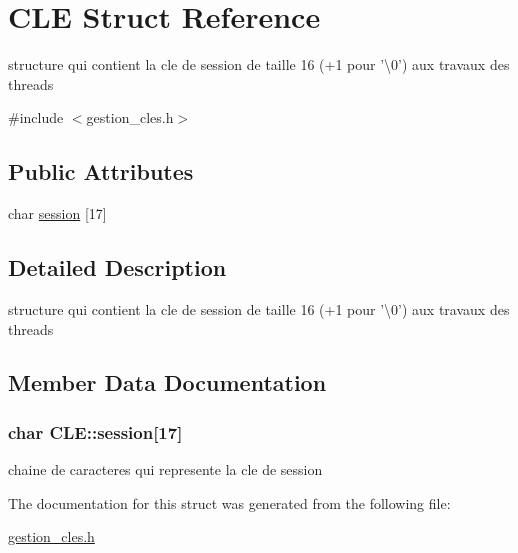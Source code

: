 \hypertarget{structCLE}{\section{C\-L\-E Struct Reference}
\label{structCLE}
}


structure qui contient la cle de session de taille 16 (+1 pour '\textbackslash{}0') aux travaux des threads  




{\ttfamily \#include $<$gestion\-\_\-cles.\-h$>$}

\subsection*{Public Attributes}
\begin{DoxyCompactItemize}
\item 
char \hyperlink{structCLE_ab52c7ba5d2eb2f86eea0e6a9da21d55c}{session} \mbox{[}17\mbox{]}
\end{DoxyCompactItemize}


\subsection{Detailed Description}
structure qui contient la cle de session de taille 16 (+1 pour '\textbackslash{}0') aux travaux des threads 

\subsection{Member Data Documentation}
\hypertarget{structCLE_ab52c7ba5d2eb2f86eea0e6a9da21d55c}{
\subsubsection[{session}]{\setlength{\rightskip}{0pt plus 5cm}char C\-L\-E\-::session\mbox{[}17\mbox{]}}}\label{structCLE_ab52c7ba5d2eb2f86eea0e6a9da21d55c}
chaine de caracteres qui represente la cle de session 

The documentation for this struct was generated from the following file\-:\begin{DoxyCompactItemize}
\item 
\hyperlink{gestion__cles_8h}{gestion\-\_\-cles.\-h}\end{DoxyCompactItemize}
